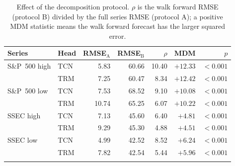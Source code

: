 \begin{table}[ht]
\caption{Effect of the decomposition protocol. $\rho$ is the walk forward RMSE (protocol B) divided by the full series RMSE (protocol A); a positive MDM statistic means the walk forward forecast has the larger squared error.}
\label{tab:leakage}
\centering
\begin{tabular}{@{}llrrrrr@{}}
\toprule
Series & Head & RMSE$_{\mathrm{A}}$ & RMSE$_{\mathrm{B}}$ & $\rho$ & MDM & $p$ \\
\midrule
S\&P~500 high & TCN & 5.83 & 60.66 & 10.40 & ${+}12.33$ & $<0.001$ \\
 & TRM & 7.25 & 60.47 & 8.34 & ${+}12.42$ & $<0.001$ \\
S\&P~500 low & TCN & 7.53 & 68.52 & 9.10 & ${+}10.08$ & $<0.001$ \\
 & TRM & 10.74 & 65.25 & 6.07 & ${+}10.22$ & $<0.001$ \\
SSEC high & TCN & 7.13 & 45.60 & 6.40 & ${+}4.81$ & $<0.001$ \\
 & TRM & 9.29 & 45.30 & 4.88 & ${+}4.51$ & $<0.001$ \\
SSEC low & TCN & 4.99 & 42.52 & 8.52 & ${+}6.24$ & $<0.001$ \\
 & TRM & 7.82 & 42.54 & 5.44 & ${+}5.96$ & $<0.001$ \\
\botrule
\end{tabular}
\end{table}
